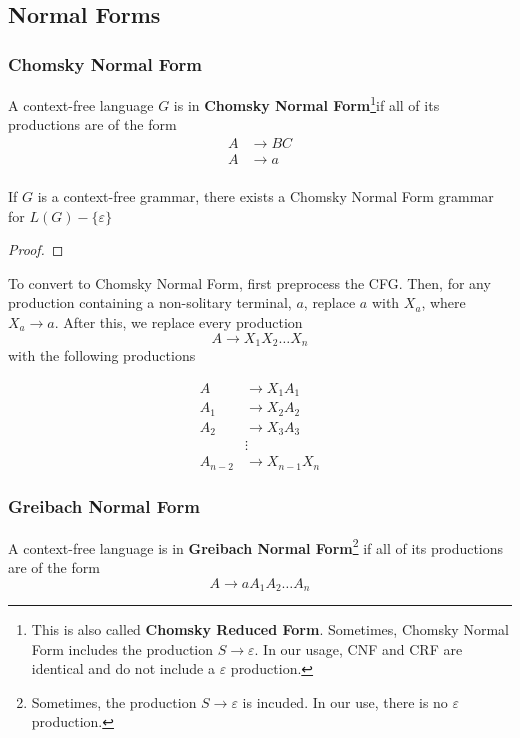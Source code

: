 \subsection{Normal Forms}\label{subsec:normal-forms}
\subsubsection{Chomsky Normal Form}\label{subsubsec:chomsky-normal-form}
\begin{definition}
    A context-free language \(G\) is in \textbf{Chomsky Normal Form}\footnote{This is also called \textbf{Chomsky Reduced Form}. Sometimes, Chomsky Normal Form includes the production \(S\to\varepsilon \). In our usage, CNF and CRF are identical and do not include a \(\varepsilon \) production.}if all of its productions are of the form 
    \begin{align*}A &\to BC\\
                  A &\to a\\
    \end{align*}
\end{definition}

\begin{theorem}
    If \(G\) is a context-free grammar, there exists a Chomsky Normal Form grammar for \(L(G)-\{\varepsilon \} \)
\end{theorem}

\begin{proof}

\end{proof}

To convert to Chomsky Normal Form, first preprocess the CFG. Then, for any production containing a non-solitary terminal, \(a\), replace \(a\) with \(X_a\), where \(X_a\to a\). After this, we replace every production \[A\to X_1X_2\hdots X_n\] with the following productions

\begin{align*}
    A &\to X_1 A_1 \\
    A_1 &\to X_2 A_2 \\
    A_2 &\to X_3 A_3 \\
        &\vdots \\
    A_{n-2} &\to X_{n-1} X_n
\end{align*}

\subsubsection{Greibach Normal Form}\label{subsubsec:greibach-normal-form}
\begin{definition}
    A context-free language is in \textbf{Greibach Normal Form}\footnote{Sometimes, the production \(S\to\varepsilon \) is incuded. In our use, there is no \(\varepsilon \) production.} if all of its productions are of the form
    \[A\to aA_1A_2\hdots A_n\]
\end{definition}


